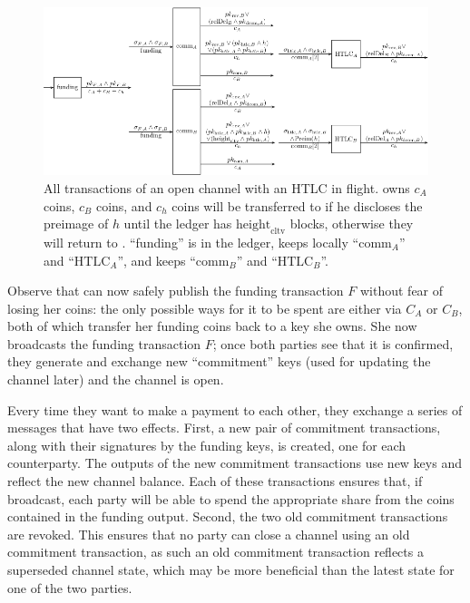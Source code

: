     \begin{figure}
      \includegraphics[width=\textwidth]{all-txs-figure}
      \caption{All transactions of an open channel with an HTLC in
      flight. \alice{} owns $c_A$ coins, \bob{} $c_B$ coins, and $c_h$ coins
      will be transferred to \bob{} if he discloses the preimage of $h$ until
      the ledger has $\mathrm{height}_{\mathrm{cltv}}$ blocks, otherwise they
      will return to \alice. ``funding'' is in the ledger, \alice{} keeps
      locally ``$\mathrm{comm}_A$'' and ``$\mathrm{HTLC}_A$'', and \bob{} keeps
      ``$\mathrm{comm}_B$'' and ``$\mathrm{HTLC}_B$''.}
      \label{fig:all-txs}
    \end{figure}

    Observe that \alice{} can now safely publish the funding transaction $F$
    without fear of losing her coins: the only possible ways for it to be spent
    are either via $C_A$ or $C_B$, both of which transfer her funding coins back
    to a key she owns. She now broadcasts the funding transaction $F$; once both
    parties see that it is confirmed, they generate and exchange new
    ``commitment'' keys (used for updating the channel later) and the channel is
    open.

    Every time they want to make a payment to each other, they exchange a series
    of messages that have two effects. First, a new pair of commitment
    transactions, along with their signatures by the funding keys, is created,
    one for each counterparty. The outputs of the new commitment transactions
    use new keys and reflect the new channel balance. Each of these transactions
    ensures that, if
    broadcast, each party will be able to spend the appropriate share from the
    coins contained in the funding output. Second, the two old commitment
    transactions are revoked. This ensures that no party can close a channel
    using an old commitment transaction, as such an old commitment transaction
    reflects a superseded channel state, which may be more beneficial than the
    latest state for one of the two parties.

